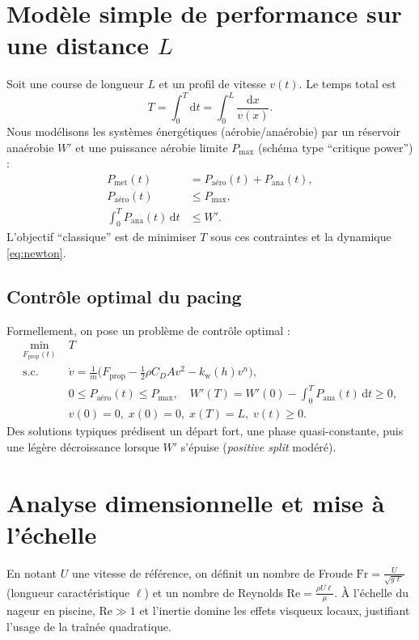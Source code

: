 \documentclass[12pt,a4paper]{article}
\newcommand{\dd}{\mathrm{d}}
\begin{document}
\section{Modèle simple de performance sur une distance $L$}
Soit une course de longueur $L$ et un profil de vitesse $v(t)$. Le temps total est
\begin{equation}
 T = \int_0^{T} \dd t = \int_0^{L} \frac{\dd x}{v(x)}.
 \end{equation}
Nous modélisons les systèmes énergétiques (aérobie/anaérobie) par un réservoir anaérobie $W'$ et une puissance aérobie limite $P_{\max}$ (schéma type ``critique power'') :
\begin{align}
 P_{\mathrm{met}}(t) &= P_\mathrm{aéro}(t) + P_\mathrm{ana}(t), \\
 P_\mathrm{aéro}(t) &\le P_{\max}, \\
 \int_0^T P_\mathrm{ana}(t)\,\dd t &\le W'.
 \end{align}
L'objectif ``classique'' est de minimiser $T$ sous ces contraintes et la dynamique \eqref{eq:newton}.

\subsection{Contrôle optimal du pacing}
Formellement, on pose un problème de contrôle optimal :
\begin{align}
 \min_{F_{\mathrm{prop}}(t)}\; &T \\
 \text{s.c. }\; &\dot v = \frac{1}{m}\Big(F_{\mathrm{prop}} - \tfrac{1}{2}\rho C_D A v^2 - k_\mathrm{w}(h)v^n\Big), \\
 &0\le P_\mathrm{aéro}(t)\le P_{\max},\quad W'(T)=W'(0)-\int_0^T P_\mathrm{ana}(t)\,\dd t\ge 0, \\
 &v(0)=0,\; x(0)=0,\; x(T)=L,\; v(t)\ge 0.
 \end{align}
Des solutions typiques prédisent un départ fort, une phase quasi-constante, puis une légère décroissance lorsque $W'$ s'épuise (\emph{positive split} modéré).

\section{Analyse dimensionnelle et mise à l'échelle}
En notant $U$ une vitesse de référence, on définit un nombre de Froude $\mathrm{Fr}=\frac{U}{\sqrt{g\ell}}$ (longueur caractéristique $\ell$) et un nombre de Reynolds $\mathrm{Re}=\frac{\rho U \ell}{\mu}$. À l'échelle du nageur en piscine, $\mathrm{Re}\gg 1$ et l'inertie domine les effets visqueux locaux, justifiant l'usage de la traînée quadratique.
\end{document}
